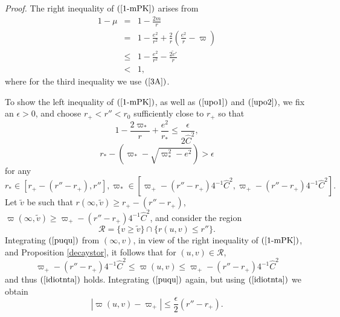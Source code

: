 \documentclass{article}
\begin{document}
\noindent\emph{Proof.} 
The right inequality of $(\ref{1-mPK})$ arises from
\begin{eqnarray*}
1-\mu	& = &	1-\frac{2m}r\\
	& = &	1-\frac{e^2}{r^2}+\frac2r\left(\frac{e^2}r-\varpi\right)\\
	&\le&	1-\frac{e^2}{r^2}-\frac{2\tilde{c}'}r\\
	& < &	1,
\end{eqnarray*}
where for the third inequality we use $(\ref{3A})$.

To show the left inequality of $(\ref{1-mPK})$, as well as $(\ref{upo1})$ and 
$(\ref{upo2})$,
we fix an $\epsilon>0$, and choose
$r_+<r''<r_0$ sufficiently close to $r_+$ so that
\begin{equation}
\label{idiotnta}
1-\frac{2\varpi_*}r+\frac{e^2}{r_*}\le\frac\epsilon{2\hat{C}^2},
\end{equation}
\begin{equation}
\label{idiotnta2}
r_*-\left(\varpi_*-\sqrt{\varpi_*^2-e^2}\right)>\epsilon
\end{equation}
for any
\[
r_*\in[r_+-(r''-r_+),r''], \varpi_*\in[\varpi_+-(r''-r_+)4^{-1}\hat{C}^2,\varpi_+-(r''-r_+)4^{-1}\hat{C}^2].
\]
Let $\tilde{v}$ be such that $r(\infty,\tilde{v})\ge r_+-(r''-r_+)$,
$\varpi(\infty,\tilde{v})\ge \varpi_+-(r''-r_+)4^{-1}\hat{C}^2$,
and consider the region
\[
\mathcal{R}=\{v\ge\tilde{v}\}\cap\{r(u,v)\le r''\}.
\]
Integrating $(\ref{puqu})$ from $(\infty,v)$,
in view of the right inequality of $(\ref{1-mPK})$, and Proposition \ref{decaystor}, 
it follows
that for $(u,v)\in\mathcal{R}$, 
\[
\varpi_+-(r''-r_+)4^{-1}\hat{C}^2\le\varpi(u,v)\le\varpi_+-(r''-r_+)4^{-1}\hat{C}^2
\]
and thus $(\ref{idiotnta})$ holds.
Integrating $(\ref{puqu})$ again, but using $(\ref{idiotnta})$ we obtain 
\begin{equation}
\label{giaparakatw}
|\varpi(u,v)-\varpi_+|\le\frac\epsilon2(r''-r_+).
\end{equation}
\end{document}
